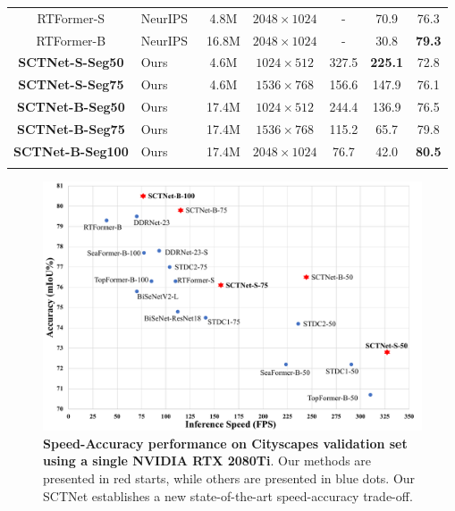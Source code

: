 \documentclass[letterpaper]{article} %
\begin{document}
\begin{table}[t]
\begin{tabular}{c l|c|c|c|c|c}
    RTFormer-S &NeurIPS~\citeyear{wang2022rtformer}    &4.8M &$2048 \times 1024$ &- &70.9 &76.3 \\
    RTFormer-B &NeurIPS~\citeyear{wang2022rtformer}    &16.8M &$2048 \times 1024$ &- &30.8 &\textbf{79.3} \\
    \hline
    \textbf{SCTNet-S-Seg50}  &Ours &4.6M &$1024 \times 512$ &327.5 &\textbf{225.1} &72.8\\
    \textbf{SCTNet-S-Seg75} &Ours &4.6M &$1536 \times 768$ &156.6 &147.9 &76.1 \\
    \textbf{SCTNet-B-Seg50}  &Ours &17.4M &$1024 \times 512$ &244.4 &136.9 &76.5 \\
    \textbf{SCTNet-B-Seg75}  &Ours &17.4M &$1536 \times 768$ &115.2 &65.7 &79.8\\
    \textbf{SCTNet-B-Seg100} &Ours &17.4M &$2048 \times 1024$ &76.7  &42.0 &\textbf{80.5} \\
    \Xhline{1pt}
  \end{tabular}
\end{table}


\begin{figure}[tb]
\begin{center}
   \includegraphics[width=\linewidth]{./image/supp/supp_figure1_trade-off.pdf}
\end{center}
   \caption{\textbf{Speed-Accuracy performance on Cityscapes validation set using a single NVIDIA RTX 2080Ti}. Our methods are presented in red starts, while others are presented in blue dots. Our SCTNet establishes a new state-of-the-art speed-accuracy trade-off.}
\label{suppfig:figure1_trade-off}
\end{figure}
\end{document}
